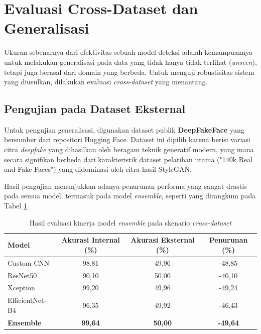 \section{Evaluasi Cross-Dataset dan Generalisasi}

Ukuran sebenarnya dari efektivitas sebuah model deteksi adalah kemampuannya untuk melakukan generalisasi pada data yang tidak hanya tidak terlihat (\textit{unseen}), tetapi juga berasal dari domain yang berbeda. Untuk menguji robustisitas sistem yang diusulkan, dilakukan evaluasi \textit{cross-dataset} yang menantang.

\subsection{Pengujian pada Dataset Eksternal}
Untuk pengujian generalisasi, digunakan dataset publik \textbf{DeepFakeFace} yang bersumber dari repositori Hugging Face. Dataset ini dipilih karena berisi variasi citra \textit{deepfake} yang dihasilkan oleh beragam teknik generatif modern, yang mana secara signifikan berbeda dari karakteristik dataset pelatihan utama ("140k Real and Fake Faces") yang didominasi oleh citra hasil StyleGAN.

Hasil pengujian menunjukkan adanya penurunan performa yang sangat drastis pada semua model, termasuk pada model \textit{ensemble}, seperti yang dirangkum pada Tabel \ref{tab:cross_dataset_results}.

\begin{table}[H]
    \centering
    \caption{Hasil evaluasi kinerja model \textit{ensemble} pada skenario \textit{cross-dataset}}
    \label{tab:cross_dataset_results}
    \begin{tabular}{|l|c|c|c|}
        \hline
        \textbf{Model} & \textbf{Akurasi Internal (\%)} & \textbf{Akurasi Eksternal (\%)} & \textbf{Penurunan (\%)} \\
        \hline
        Custom CNN & 98,81 & 49,96 & -48,85 \\
        ResNet50 & 90,10 & 50,00 & -40,10 \\
        Xception & 99,20 & 49,96 & -49,24 \\
        EfficientNet-B4 & 96,35 & 49,92 & -46,43 \\
        \hline
        \textbf{Ensemble} & \textbf{99,64} & \textbf{50,00} & \textbf{-49,64} \\
        \hline
    \end{tabular}
\end{table}

